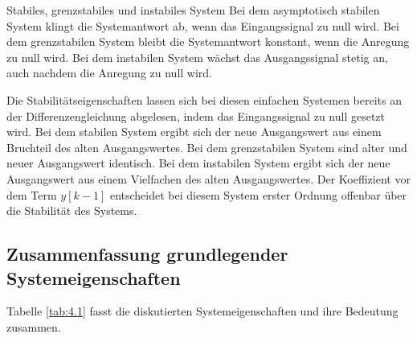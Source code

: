 \begin{example}{Stabiles, grenzstabiles und instabiles System}
Bei dem asymptotisch stabilen System klingt die Systemantwort ab, wenn das Eingangssignal zu null wird. Bei dem grenzstabilen System bleibt die Systemantwort konstant, wenn die Anregung zu null wird. Bei dem instabilen System wächst das Ausgangssignal stetig an, auch nachdem die Anregung zu null wird.

Die Stabilitätseigenschaften lassen sich bei diesen einfachen Systemen bereits an der Differenzengleichung abgelesen, indem das Eingangssignal zu null gesetzt wird. Bei dem stabilen System ergibt sich der neue Ausgangswert aus einem Bruchteil des alten Ausgangswertes. Bei dem grenzstabilen System sind alter und neuer Ausgangswert identisch. Bei dem instabilen System ergibt sich der neue Ausgangswert aus einem Vielfachen des alten Ausgangswertes. Der Koeffizient vor dem Term \(y[k - 1]\) entscheidet bei diesem System erster Ordnung offenbar über die Stabilität des Systems.

\end{example}

\subsection{\texorpdfstring{Zusammenfassung grundlegender Systemeigenschaften }{Zusammenfassung grundlegender Systemeigenschaften }}\label{zusammenfassung-grundlegender-systemeigenschaften}

Tabelle \ref{tab:4.1} fasst die diskutierten Systemeigenschaften und ihre Bedeutung zusammen.


